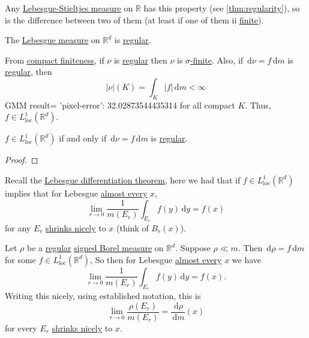 \begin{eg}
	Any \hyperref[def:Lebesgue-Stieltjes-measure]{Lebesgue-Stieltjes measure} on \(\mathbb{R}\) has this property (see \autoref{thm:regularity}),
	so is the difference between two of them (at least if one of them ii \hyperref[def:finite-signed-measure]{finite}).

	The \hyperref[def:Lebesgue-measure]{Lebesgue measure} on \(\mathbb{R}^d\) is \hyperref[def:regular]{regular}.
\end{eg}

\begin{note}
	From \hyperref[def:regular-compact-finite]{compact finiteness}, if \(\nu\) is \hyperref[def:regular]{regular} then \(\nu\) is \hyperref[def:finite-signed-measure]{\(\sigma\)-finite}. Also,
	if \(\,\mathrm{d}\nu = f\,\mathrm{d}m\) is \hyperref[def:regular]{regular}, then
	\[
		\left\vert \nu \right\vert(K) = \int_K \left\vert f \right\vert \,\mathrm{d}m < \infty
	\]GMM result= {'pixel-error': 32.02873544435314}
	for all compact \(K\). Thus, \(f \in L^1_{\mathrm{loc}}(\mathbb{R}^d)\).
\end{note}

\begin{lemma}
	\(f \in L^1_{\mathrm{loc}}(\mathbb{R}^d)\) if and only if \(\,\mathrm{d}\nu = f \,\mathrm{d}m\) is \hyperref[def:regular]{regular}.
\end{lemma}
\begin{proof}
\end{proof}

\begin{prev}
	Recall the \hyperref[thm:Lebesgue-differentiation-theorem]{Lebesgue differentiation theorem}, here we had that if \(f \in L^1_{\mathrm{loc}}(\mathbb{R}^d)\)
	implies that for Lebesgue \hyperref[def:mu-almost-everywhere]{almost every} \(x\),
	\[
		\lim_{r \to 0} \frac{1}{m(E_r)} \int_{E_r} f(y) \,\mathrm{d}y = f(x)
	\]
	for any \(E_r\) \hyperref[def:shrink-nicely]{shrinks nicely} to \(x\) (think of \(B_r(x)\)).
\end{prev}

\begin{corollary}
	Let \(\rho\) be a \hyperref[def:regular]{regular} \hyperref[def:signed-measure]{signed Borel measure} on \(\mathbb{R}^d\). Suppose \(\rho \ll m\). Then
	\(\,\mathrm{d}\rho = f\,\mathrm{d}m\) for some \(f \in L^1_{\mathrm{loc}}(\mathbb{R}^d)\), So then for Lebesgue \hyperref[def:mu-almost-everywhere]{almost every} \(x\)
	we have
	\[
		\lim_{r \to 0} \frac{1}{m(E_r)} \int_{E_r} f(y) \,\mathrm{d}y = f(x).
	\]
	Writing this nicely, using established notation, this is
	\[
		\lim_{r \to 0} \frac{\rho(E_r)}{m(E_r)} = \frac{\,\mathrm{d}\rho}{\,\mathrm{d}m}(x)
	\]
	for every \(E_r\) \hyperref[def:shrink-nicely]{shrinks nicely} to \(x\).
\end{corollary}


